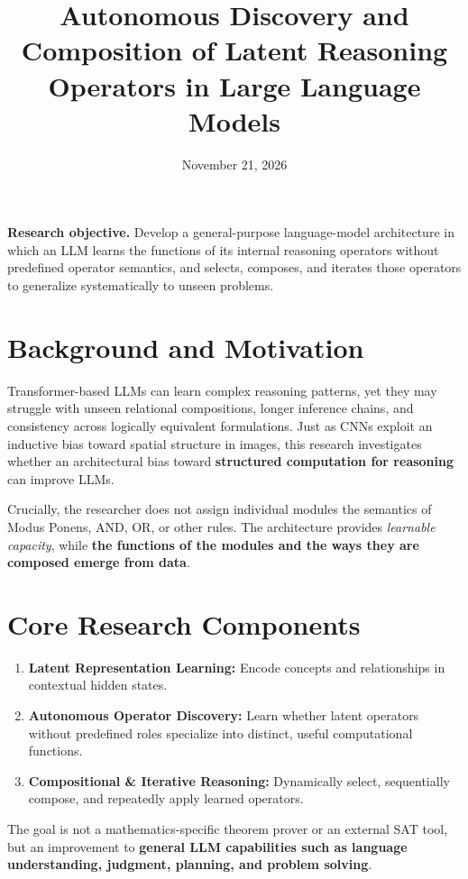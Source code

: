 \documentclass[11pt,a4paper]{article}
\title{Autonomous Discovery and Composition of Latent Reasoning Operators in Large Language Models}
\author{}
\date{November 21, 2026}
\begin{document}
\maketitle
\textbf{Research objective.} Develop a general-purpose language-model architecture in which an LLM learns the functions of its internal reasoning operators without predefined operator semantics, and selects, composes, and iterates those operators to generalize systematically to unseen problems.

\section{Background and Motivation}
Transformer-based LLMs can learn complex reasoning patterns, yet they may struggle with unseen relational compositions, longer inference chains, and consistency across logically equivalent formulations. Just as CNNs exploit an inductive bias toward spatial structure in images, this research investigates whether an architectural bias toward \textbf{structured computation for reasoning} can improve LLMs.

Crucially, the researcher does not assign individual modules the semantics of Modus Ponens, AND, OR, or other rules. The architecture provides \emph{learnable capacity}, while \textbf{the functions of the modules and the ways they are composed emerge from data}.

\section{Core Research Components}
\begin{enumerate}
\item \textbf{Latent Representation Learning:} Encode concepts and relationships in contextual hidden states.
\item \textbf{Autonomous Operator Discovery:} Learn whether latent operators without predefined roles specialize into distinct, useful computational functions.
\item \textbf{Compositional \& Iterative Reasoning:} Dynamically select, sequentially compose, and repeatedly apply learned operators.
\end{enumerate}
The goal is not a mathematics-specific theorem prover or an external SAT tool, but an improvement to \textbf{general LLM capabilities such as language understanding, judgment, planning, and problem solving}.
\end{document}
